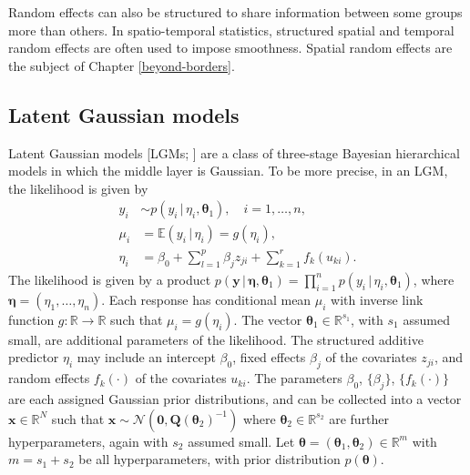 \documentclass[a4paper, nobind]{templates/ociamthesis}
\begin{document}
Random effects can also be structured to share information between some groups more than others.
In spatio-temporal statistics, structured spatial and temporal random effects are often used to impose smoothness.
Spatial random effects are the subject of Chapter \ref{beyond-borders}.

\hypertarget{latent-gaussian-models}{%
\subsection{Latent Gaussian models}\label{latent-gaussian-models}}

Latent Gaussian models {[}LGMs; \textcite{rue2009approximate}{]} are a class of three-stage Bayesian hierarchical models in which the middle layer is Gaussian.
To be more precise, in an LGM, the likelihood is given by
\begin{align*}
y_i &\sim p(y_i \, | \, \eta_i, \boldsymbol{\mathbf{\theta}}_1), \quad i = 1, \ldots, n, \\
\mu_i &= \mathbb{E}(y_i \, | \, \eta_i) = g(\eta_i), \\
\eta_i &= \beta_0 + \sum_{l = 1}^{p} \beta_j z_{ji} + \sum_{k = 1}^{r} f_k(u_{ki}).
\end{align*}
The likelihood is given by a product \(p(\mathbf{y} \, | \, \boldsymbol{\mathbf{\eta}}, \boldsymbol{\mathbf{\theta}}_1) = \prod_{i = 1}^n p(y_i \, | \, \eta_i, \boldsymbol{\mathbf{\theta}}_1)\), where \(\boldsymbol{\mathbf{\eta}} = (\eta_1, \ldots, \eta_n)\).
Each response has conditional mean \(\mu_i\) with inverse link function \(g: \mathbb{R} \to \mathbb{R}\) such that \(\mu_i = g(\eta_i)\).
The vector \(\boldsymbol{\mathbf{\theta}}_1 \in \mathbb{R}^{s_1}\), with \(s_1\) assumed small, are additional parameters of the likelihood.
The structured additive predictor \(\eta_i\) may include an intercept \(\beta_0\), fixed effects \(\beta_j\) of the covariates \(z_{ji}\), and random effects \(f_k(\cdot)\) of the covariates \(u_{ki}\).
The parameters \(\beta_0\), \(\{\beta_j\}\), \(\{f_k(\cdot)\}\) are each assigned Gaussian prior distributions, and can be collected into a vector \(\mathbf{x} \in \mathbb{R}^N\) such that \(\mathbf{x} \sim \mathcal{N}(\mathbf{0}, \mathbf{Q}(\boldsymbol{\mathbf{\theta}}_2)^{-1})\) where \(\boldsymbol{\mathbf{\theta}}_2 \in \mathbb{R}^{s_2}\) are further hyperparameters, again with \(s_2\) assumed small.
Let \(\boldsymbol{\mathbf{\theta}} = (\boldsymbol{\mathbf{\theta}}_1, \boldsymbol{\mathbf{\theta}}_2) \in \mathbb{R}^m\) with \(m = s_1 + s_2\) be all hyperparameters, with prior distribution \(p(\boldsymbol{\mathbf{\theta}})\).
\end{document}
